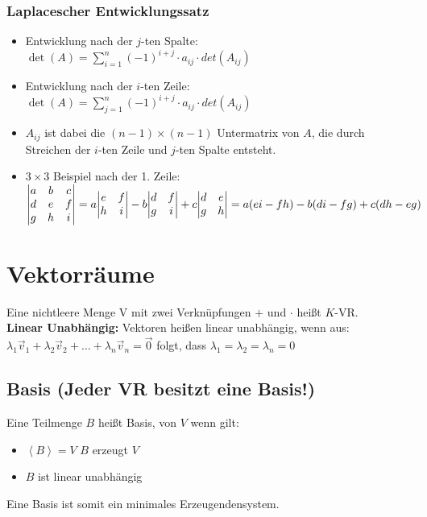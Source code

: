 \documentclass[7pt,a4paper]{scrartcl}
\begin{document}
\begin{multicols}{3}
\subsubsection{Laplacescher Entwicklungssatz}
\begin{itemize}
	\item Entwicklung nach der $j$-ten Spalte:
	\subitem $\det(A)=\sum\limits_{i=1}^n (-1)^{i+j} \cdot a_{ij} \cdot det(A_{ij})$
	\item Entwicklung nach der $i$-ten Zeile:
	\subitem $\det(A)=\sum\limits_{j=1}^n (-1)^{i+j} \cdot a_{ij} \cdot det(A_{ij})$
	\item $A_{ij}$ ist dabei die $(n-1)\times(n-1)$ Untermatrix von $A$, die durch Streichen der $i$-ten Zeile und $j$-ten Spalte entsteht.
	\item $3\times 3$ Beispiel nach der 1. Zeile: ${\begin{vmatrix}a&b&c\\d&e&f\\g&h&i\end{vmatrix}}\\=a{\begin{vmatrix}e&f\\h&i\end{vmatrix}}-b{\begin{vmatrix}d&f\\g&i\end{vmatrix}}+c{\begin{vmatrix}d&e\\g&h\end{vmatrix}}=a(ei-fh)-b(di-fg)+c(dh-eg)$
\end{itemize}

\section{Vektorräume}
Eine nichtleere Menge V mit zwei Verknüpfungen $+$ und $\cdot$ heißt $K$-VR.\\
\textbf{Linear Unabhängig:}
Vektoren heißen linear unabhängig, wenn aus: \\
$\lambda_1 \vec v_1 + \lambda_2 \vec v_2 + \ldots + \lambda_n \vec v_n = \vec 0$ folgt, dass $\lambda_1 = \lambda_2 = \lambda_n = 0$

\subsection{Basis (Jeder VR besitzt eine Basis!)}
\label{sub:basis}
Eine Teilmenge $B$ heißt Basis, von $V$ wenn gilt:
\begin{itemize}\itemsep0pt
	\item $\left\langle B \right\rangle =V$  $B$ erzeugt $V$
	\item $B$ ist linear unabhängig
\end{itemize}
Eine Basis ist somit ein minimales Erzeugendensystem.          


\end{multicols}
\end{document}
